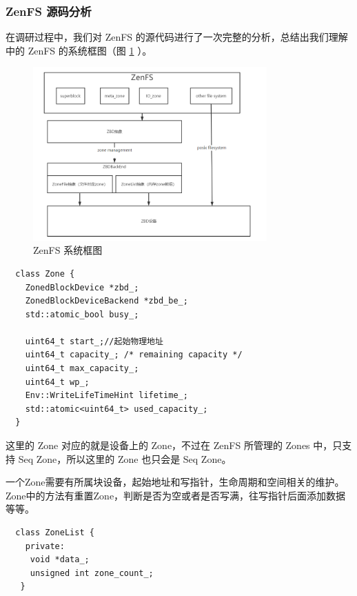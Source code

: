 \subsubsection{ZenFS 源码分析}

在调研过程中，我们对 ZenFS 的源代码进行了一次完整的分析，总结出我们理解中的 ZenFS 的系统框图（图 \ref{zenfs} ）。

\begin{figure}[htbp]
    \centering
    \includegraphics[width=0.8\textwidth]{fig/zenfs}
    \caption{ZenFS 系统框图}
    \label{zenfs}
\end{figure}


\begin{lstlisting}
  class Zone {
    ZonedBlockDevice *zbd_;
    ZonedBlockDeviceBackend *zbd_be_;
    std::atomic_bool busy_;
    
    uint64_t start_;//起始物理地址
    uint64_t capacity_; /* remaining capacity */
    uint64_t max_capacity_;
    uint64_t wp_;
    Env::WriteLifeTimeHint lifetime_;
    std::atomic<uint64_t> used_capacity_;
  }  
\end{lstlisting}

这里的 Zone 对应的就是设备上的 Zone，不过在 ZenFS 所管理的 Zones 中，只支持 Seq Zone，所以这里的 Zone 也只会是 Seq Zone。

一个Zone需要有所属块设备，起始地址和写指针，生命周期和空间相关的维护。
Zone中的方法有重置Zone，判断是否为空或者是否写满，往写指针后面添加数据等等。


\begin{lstlisting}
  class ZoneList {
    private:
     void *data_;
     unsigned int zone_count_;
   }   
\end{lstlisting}

